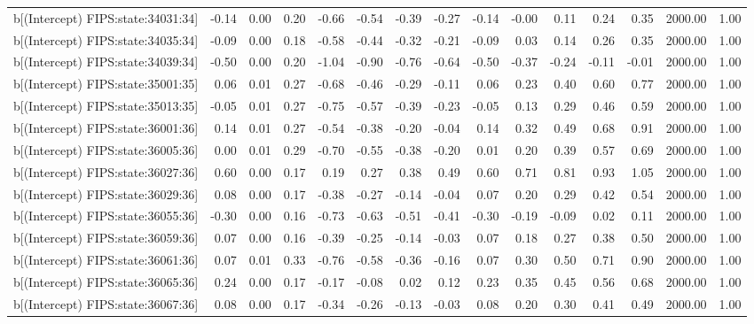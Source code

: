 \begin{table}[ht]
\begin{tabular}{rrrrrrrrrrrrrrr}
  b[(Intercept) FIPS:state:34031:34] & -0.14 & 0.00 & 0.20 & -0.66 & -0.54 & -0.39 & -0.27 & -0.14 & -0.00 & 0.11 & 0.24 & 0.35 & 2000.00 & 1.00 \\ 
  b[(Intercept) FIPS:state:34035:34] & -0.09 & 0.00 & 0.18 & -0.58 & -0.44 & -0.32 & -0.21 & -0.09 & 0.03 & 0.14 & 0.26 & 0.35 & 2000.00 & 1.00 \\ 
  b[(Intercept) FIPS:state:34039:34] & -0.50 & 0.00 & 0.20 & -1.04 & -0.90 & -0.76 & -0.64 & -0.50 & -0.37 & -0.24 & -0.11 & -0.01 & 2000.00 & 1.00 \\ 
  b[(Intercept) FIPS:state:35001:35] & 0.06 & 0.01 & 0.27 & -0.68 & -0.46 & -0.29 & -0.11 & 0.06 & 0.23 & 0.40 & 0.60 & 0.77 & 2000.00 & 1.00 \\ 
  b[(Intercept) FIPS:state:35013:35] & -0.05 & 0.01 & 0.27 & -0.75 & -0.57 & -0.39 & -0.23 & -0.05 & 0.13 & 0.29 & 0.46 & 0.59 & 2000.00 & 1.00 \\ 
  b[(Intercept) FIPS:state:36001:36] & 0.14 & 0.01 & 0.27 & -0.54 & -0.38 & -0.20 & -0.04 & 0.14 & 0.32 & 0.49 & 0.68 & 0.91 & 2000.00 & 1.00 \\ 
  b[(Intercept) FIPS:state:36005:36] & 0.00 & 0.01 & 0.29 & -0.70 & -0.55 & -0.38 & -0.20 & 0.01 & 0.20 & 0.39 & 0.57 & 0.69 & 2000.00 & 1.00 \\ 
  b[(Intercept) FIPS:state:36027:36] & 0.60 & 0.00 & 0.17 & 0.19 & 0.27 & 0.38 & 0.49 & 0.60 & 0.71 & 0.81 & 0.93 & 1.05 & 2000.00 & 1.00 \\ 
  b[(Intercept) FIPS:state:36029:36] & 0.08 & 0.00 & 0.17 & -0.38 & -0.27 & -0.14 & -0.04 & 0.07 & 0.20 & 0.29 & 0.42 & 0.54 & 2000.00 & 1.00 \\ 
  b[(Intercept) FIPS:state:36055:36] & -0.30 & 0.00 & 0.16 & -0.73 & -0.63 & -0.51 & -0.41 & -0.30 & -0.19 & -0.09 & 0.02 & 0.11 & 2000.00 & 1.00 \\ 
  b[(Intercept) FIPS:state:36059:36] & 0.07 & 0.00 & 0.16 & -0.39 & -0.25 & -0.14 & -0.03 & 0.07 & 0.18 & 0.27 & 0.38 & 0.50 & 2000.00 & 1.00 \\ 
  b[(Intercept) FIPS:state:36061:36] & 0.07 & 0.01 & 0.33 & -0.76 & -0.58 & -0.36 & -0.16 & 0.07 & 0.30 & 0.50 & 0.71 & 0.90 & 2000.00 & 1.00 \\ 
  b[(Intercept) FIPS:state:36065:36] & 0.24 & 0.00 & 0.17 & -0.17 & -0.08 & 0.02 & 0.12 & 0.23 & 0.35 & 0.45 & 0.56 & 0.68 & 2000.00 & 1.00 \\ 
  b[(Intercept) FIPS:state:36067:36] & 0.08 & 0.00 & 0.17 & -0.34 & -0.26 & -0.13 & -0.03 & 0.08 & 0.20 & 0.30 & 0.41 & 0.49 & 2000.00 & 1.00 \\ 

\end{tabular}
\end{table}
